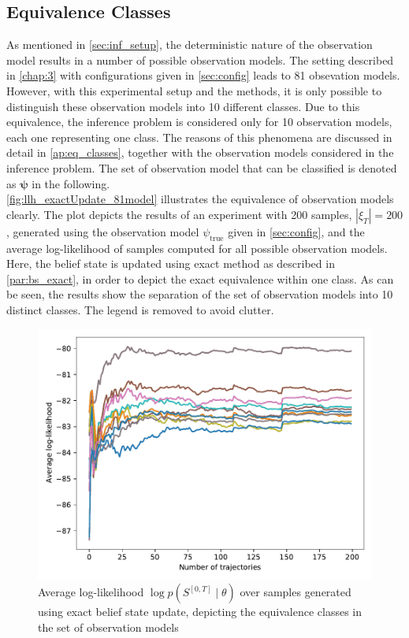 \subsection{Equivalence Classes}
\label{sec:eq_classes}
As mentioned in \cref{sec:inf_setup}, the deterministic nature of the observation model results in a number of possible observation models. The setting described in \cref{chap:3} with configurations given in \cref{sec:config} leads to 81 obsevation models. However, with this experimental setup and the methods, it is only possible to distinguish these observation models into 10 different classes. Due to this equivalence, the inference problem is considered only for 10 observation models, each one representing one class. The reasons of this phenomena are discussed in detail in \cref{ap:eq_classes}, together with the observation models considered in the inference problem. The set of observation model that can be classified is denoted as $ \symbf{\psi} $ in the following. \\
\autoref{fig:llh_exactUpdate_81model} illustrates the equivalence of observation models clearly. The plot depicts the results of an experiment with 200 samples, $ |\xi_T| = 200 $, generated using the observation model $ \psi_{\text{true}} $ given in \cref{sec:config}, and the average log-likelihood of samples computed for all possible observation models. Here, the belief state is updated using exact method as described in \cref{par:bs_exact}, in order to depict the exact equivalence within one class. As can be seen, the results show the separation of the set of observation models into 10 distinct classes. The legend is removed to avoid clutter.
\begin{figure}[H]
	\begin{center}
		\includegraphics[width=.8\textwidth]{figures/equivalence_classes/llh_exactUpdate_81model}
		\caption{Average log-likelihood $ \log p(S^{[0,T]} \mid \theta) $ over samples generated using exact belief state update, depicting the equivalence classes in the set of observation models}
		\label{fig:llh_exactUpdate_81model}
	\end{center}
\end{figure}
